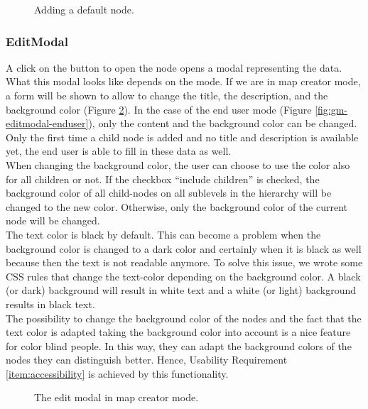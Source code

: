 \begin{figure}[H]
	\centering
	\caption{Adding a default node.}
	\label{fig:gm-add-default}
\end{figure}



\subsubsection{EditModal}\label{sec:editmodal}
A click on the button to open the node opens a modal representing the data. What this modal looks like depends on the mode. If we are in map creator mode, a form will be shown to allow to change the title, the description, and the background color (Figure \ref{fig:gm-editmodal-mapcreator}). In the case of the end user mode (Figure \ref{fig:gm-editmodal-enduser}), only the content and the background color can be changed. Only the first time a child node is added and no title and description is available yet, the end user is able to fill in these data as well.\\

When changing the background color, the user can choose to use the color also for all children or not. If the checkbox ``include children'' is checked, the background color of all child-nodes on all sublevels in the hierarchy will be changed to the new color. Otherwise, only the background color of the current node will be changed.\\

The text color is black by default. This can become a problem when the background color is changed to a dark color and certainly when it is black as well because then the text is not readable anymore. To solve this issue, we wrote some CSS rules that change the text-color depending on the background color. A black (or dark) background will result in white text and a white (or light) background results in black text.\\

The possibility to change the background color of the nodes and the fact that the text color is adapted taking the background color into account is a nice feature for color blind people. In this way, they can adapt the background colors of the nodes they can distinguish better. Hence, Usability Requirement \ref{item:accessibility} is achieved by this functionality.

\begin{figure}[H]
	\centering
	\caption{The edit modal in map creator mode.}
	\label{fig:gm-editmodal-mapcreator}
\end{figure}

